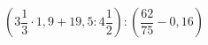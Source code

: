 \begin{ex}[type=calculate]
	\begin{condition}
		\( \left( 3\dfrac{1}{3}\cdot1,9+19,5:4\dfrac{1}{2}  \right):\left( \dfrac{62}{75}-0,16 \right)\)
	\end{condition}
\end{ex}